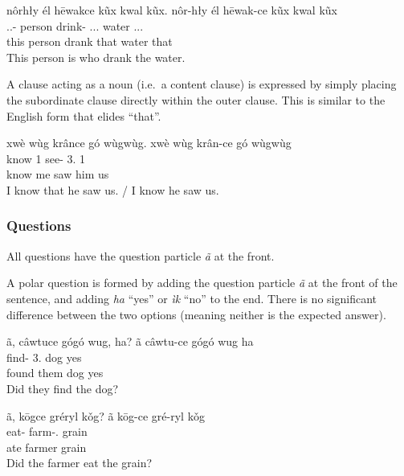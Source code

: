 \documentclass[12pt]{article}
\begin{document}
    \begin{exe}
        \ex
        nôrhły él hēwakce kũx kwal kũx.
        \glll
        nôr-hły él hēwak-ce kũx kwal kũx \\
        \Dem{}.\Anim{}.\Prox{}-\Adj{} person drink-\Pst{} \Dem{}.\Anim{}.\Dist{}.\Sg{} water \Dem{}.\Anim{}.\Dist{}.\Sg{} \\
        this person drank that water that \\
        \glt
        This person is who drank the water.
    \end{exe}

    A clause acting as a noun (i.e.\ a content clause)
    is expressed by simply placing the subordinate clause directly within the outer clause.
    This is similar to the English form that elides ``that''.

    \begin{exe}
        \ex
        \glt
        xwè wùg krânce gó wùgwùg.
        \glll
        xwè wùg krân-ce gó wùgwùg \\
        know 1\Sg{} see-\Pst{} 3\Sg{}.\Anim{} 1\Pl{} \\
        know me saw him us \\
        \glt
        I know that he saw us.
        /
        I know he saw us.
    \end{exe}

    \subsubsection*{Questions}
    All questions have the question particle \textit{ã} at the front.

    A polar question is formed by adding the question particle \textit{ã}
    at the front of the sentence,
    and adding \textit{ha} ``yes'' or \textit{ìk} ``no'' to the end.
    There is no significant difference between the two options
    (meaning neither is the expected answer).

    \begin{exe}
        \ex
        \glt
        ã, câwtuce gógó wug, ha?
        \glll
        ã câwtu-ce gógó wug ha \\
        \Q{} find-\Pst{} 3\Pl{}.\Anim{} dog yes \\
        \Q{} found them dog yes \\
        \glt
        Did they find the dog?
    \end{exe}

    \begin{exe}
        \ex
        \glt
        ã, kōgce gréryl kǒg?
        \glll
        ã kōg-ce gré-ryl kǒg \\
        \Q{} eat-\Pst{} farm-\Agt{}.\Anim{} grain \\
        \Q{} ate farmer grain \\
        \glt
        Did the farmer eat the grain?
    \end{exe}
\end{document}
